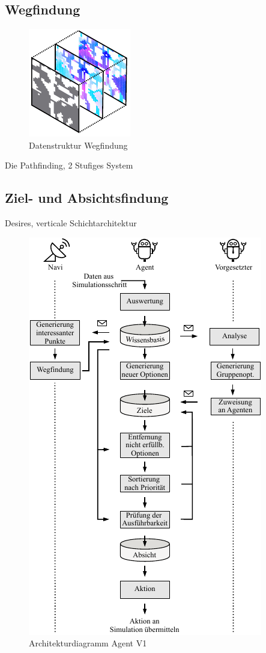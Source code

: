 \documentclass[runningheads]{llncs}
\begin{document}
\subsection{Wegfindung}\label{wegfindung}

\begin{figure}
\includegraphics{./Referenzen/Pathfinding.pdf}
\caption{Datenstruktur Wegfindung}
\label{g3:architecture}
\end{figure}
Die 
Pathfinding, 2 Stufiges System

\subsection{Ziel- und Absichtsfindung}\label{absichtsfindung}
Desires, verticale Schichtarchitektur

\begin{figure}
\includegraphics{./Referenzen/Entscheidungsfindung.pdf}
\caption{Architekturdiagramm Agent V1}
\label{g3:architecture}
\end{figure}
\end{document}
